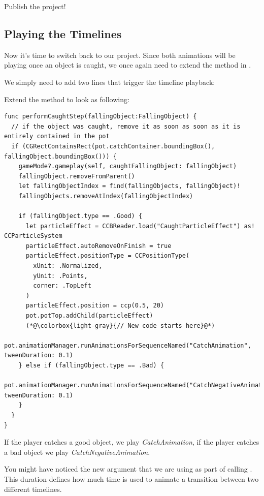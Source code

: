 \begin{leftbar}
Publish the \SB{} project!
\end{leftbar}

\subsection{Playing the Timelines}
Now it's time to switch back to our \xcode{} project. Since both animations
will be playing once an object is caught, we once again need to extend the
 method in
.

We simply need to add two lines that trigger the timeline playback:
\begin{leftbar}
Extend the  method to look as
following:
\begin{lstlisting}
func performCaughtStep(fallingObject:FallingObject) {
  // if the object was caught, remove it as soon as soon as it is entirely contained in the pot
  if (CGRectContainsRect(pot.catchContainer.boundingBox(), fallingObject.boundingBox())) {
    gameMode?.gameplay(self, caughtFallingObject: fallingObject)
    fallingObject.removeFromParent()
    let fallingObjectIndex = find(fallingObjects, fallingObject)!
    fallingObjects.removeAtIndex(fallingObjectIndex)
    
    if (fallingObject.type == .Good) {
      let particleEffect = CCBReader.load("CaughtParticleEffect") as! CCParticleSystem
      particleEffect.autoRemoveOnFinish = true
      particleEffect.positionType = CCPositionType(
        xUnit: .Normalized,
        yUnit: .Points,
        corner: .TopLeft
      )
      particleEffect.position = ccp(0.5, 20)
      pot.potTop.addChild(particleEffect)
      (*@\colorbox{light-gray}{// New code starts here}@*)
      pot.animationManager.runAnimationsForSequenceNamed("CatchAnimation", tweenDuration: 0.1)
    } else if (fallingObject.type == .Bad) {
      pot.animationManager.runAnimationsForSequenceNamed("CatchNegativeAnimation", tweenDuration: 0.1)
    }
  }
}
\end{lstlisting}
\end{leftbar}

If the player catches a good object, we play \textit{CatchAnimation}, if the
player catches a bad object we play \textit{CatchNegativeAnimation}.

You might have noticed the new  argument that we are
using as part of calling . This
duration defines how much time is used to animate a transition between two
different timelines.

